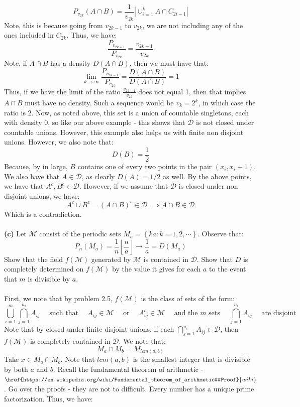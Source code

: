 \documentclass[12pt,a4paper]{article}
\newcommand{\1}[1]{\mathbbm{1}\left\{ #1 \right\}}
\newcommand{\dcal}{\mathcal{D}}
\newcommand{\mcal}{\mathcal{M}}
\newcommand{\floor}[1]{\left\lfloor #1 \right\rfloor}
\begin{document}
$$
	P_{v_{2k}}(A \cap B) = \frac{1}{v_{2k}} \left|\cup_{i=1}^k A \cap C_{2i-1}\right|
$$
Note, this is because going from $v_{2k-1}$ to $v_{2k}$, we are not including any of the ones included in $C_{2k}$. Thus, we have:
$$
	\frac{P_{v_{2k-1}}}{P_{v_{2k}}} = \frac{v_{2k-1}}{v_{2k}}
$$
Note, if $A \cap B$ has a density $D(A \cap B)$, then we must have that:
$$
	\lim_{k \to \infty} \frac{P_{v_{2k-1}}}{P_{v_{2k}}} = \frac{D(A \cap B)}{D(A \cap B)} = 1
$$
Thus, if we have the limit of the ratio $\frac{v_{2k-1}}{v_{2k}}$ does not equal 1, then that implies $A \cap B$ must have no density. Such a sequence would be $v_k = 2^k$, in which case the ratio is $2$. Now, as noted above, this set is a union of countable singletons, each with density 0, so like our above example - this shows that $\dcal$ is not closed under countable unions. However, this example also helps us with finite non disjoint unions. However, we also note that:
$$
	D(B) = \frac{1}{2}
$$
Because, by in large, $B$ contains one of every two points in the pair $(x_i,x_i+1)$. We also have that $A \in \dcal$, as clearly $D(A) = 1/2$ as well. By the above points, we have that $A^c, B^c \in \dcal$. However, if we assume that $\dcal$ is closed under non disjoint unions, we have:
$$
	A^c \cup B^c = (A \cap B)^c \in \dcal \implies A \cap B \in \dcal
$$
Which is a contradiction.
\\\\
\textbf{(c)} Let $\mcal$ consist of the periodic sets $M_a = \left\{ka : k = 1, 2, \cdots\right\}$. Observe that:
$$
	P_n(M_a) = \frac{1}{n}\floor{\frac{n}{a}} \to \frac{1}{a} = D(M_a)
$$
Show that the field $f(\mcal)$ generated by $\mcal$ is contained in $\dcal$. Show that $D$ is completely determined on $f(\mcal)$ by the value it gives for each $a$ to the event that $m$ is divisible by $a$.
\\\\
First, we note that by problem 2.5, $f(\mcal)$ is the class of sets of the form:
$$
	\bigcup_{i=1}^m \bigcap_{j=1}^{n_i} A_{ij} \quad \text{ such that } \quad
	A_{ij} \in \mcal \quad \text{ or } \quad A_{ij}^c \in \mcal \quad \text{ and the $m$ sets } \quad
	\bigcap_{j=1}^{n_i} A_{ij} \quad \text{ are disjoint}
$$
Note that by closed under finite disjoint unions, if each $\bigcap_{j=1}^{n_i} A_{ij} \in \dcal$, then $f(\mcal)$ is completely contained in $\dcal$. We note that:
$$
	M_a \cap M_b = M_{lcm(a,b)}
$$
Take $x \in M_a \cap M_b$. Note that $lcm(a,b)$ is the smallest integer that is divisible by both $a$ and $b$. Recall the fundamental theorem of arithmetic - $\href{https://en.wikipedia.org/wiki/Fundamental_theorem_of_arithmetic#Proof}{wiki}$. Go over the proofs - they are not to difficult. Every number has a unique prime factorization. Thus, we have:
\end{document}
